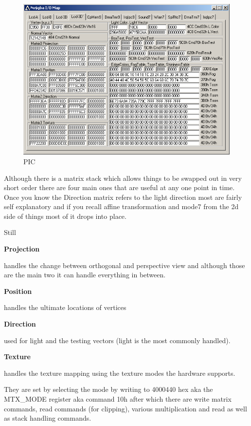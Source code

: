 \documentclass[
]{book}
\begin{document}
\begin{figure}
\centering
\includegraphics{images/62_home_fast6191_romhackingguide_unrenamed_file___l_borders_romhackingguidegraphics3dmatrix_2.png}
\caption{PIC}
\end{figure}

Although there is a matrix stack which allows things to be swapped out in very short order there are four main ones that are useful at any one point in time. Once you know the Direction matrix refers to the light direction most are fairly self explanatory and if you recall affine transformation and mode7 from the 2d side of things most of it drops into place.

Still

\textbf{Projection}

handles the change between orthogonal and perspective view and although those are the main two it can handle everything in between.

\textbf{Position}

handles the ultimate locations of vertices

\textbf{Direction}

used for light and the testing vectors (light is the most commonly handled).

\textbf{Texture}

handles the texture mapping using the texture modes the hardware supports.

They are set by selecting the mode by writing to 4000440 hex aka the MTX\_MODE register aka command 10h after which there are write matrix commands, read commands (for clipping), various multiplication and read as well as stack handling commands.
\end{document}
